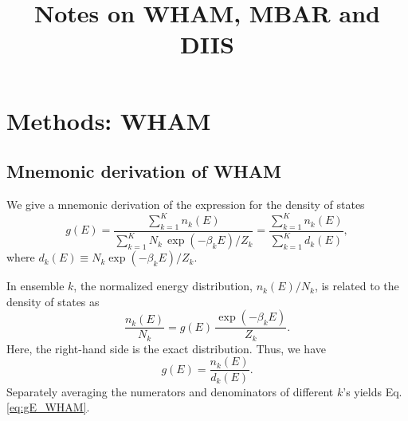 \documentclass[aip,jcp,preprint,notitlepage, superscriptaddress]{revtex4-1}
\begin{document}
\renewcommand{\theequation}{N.\arabic{equation}}

\newcommand{\vct}[1]{\bm{\mathrm{#1}}}
\newcommand{\vx}{\vct{x}}
\newcommand{\vy}{\vct{y}}
\newcommand{\Z}{\mathcal{Z}}
\newcommand{\E}{\mathcal{E}}
\newcommand{\Ham}{\mathcal{H}}
\newcommand{\W}{\mathcal{W}}
\newcommand{\A}{\mathcal{A}}
\newcommand{\var}{\mathrm{var}}

\newcommand{\repl}[2]{{\color{gray} [#1] }{\color{blue} #2}}
\newcommand{\add}[1]{{\color{blue} #1}}
\newcommand{\del}[1]{{\color{gray} [#1]}}
\newcommand{\note}[1]{{\color{OliveGreen}\small [\textbf{Comment.} #1]}}




\title{Notes on WHAM, MBAR and DIIS}

\maketitle


\tableofcontents



\section{Methods: WHAM}



\subsection{Mnemonic derivation of WHAM}



We give a mnemonic derivation of the expression
for the density of states
%
\begin{equation}
g(E)
=
\frac{
  \sum_{k = 1}^K n_k(E)
}
{
  \sum_{k = 1}^K N_k \, \exp(-\beta_k E) / Z_k
}
=
\frac{
  \sum_{k = 1}^K n_k(E)
}
{
  \sum_{k = 1}^K d_k(E)
},
\label{eq:gE_WHAM}
\end{equation}
%
where
$d_k(E) \equiv N_k \exp(-\beta_k E) / Z_k$.



In ensemble $k$,
the normalized energy distribution,
$n_k(E) / N_k$,
is related to the density of states as
%
\begin{equation}
\frac{ n_k(E) } { N_k }
=
g(E) \,
\frac{ \exp(-\beta_k E) } { Z_k }.
\end{equation}
%
Here, the right-hand side
is the exact distribution.
%
Thus,
we have
%
\begin{equation}
g(E)
=
\frac{ n_k(E) }
     { d_k(E) }.
\label{eq:gnk}
\end{equation}
%
Separately averaging the numerators and denominators of different $k$'s
yields Eq. \eqref{eq:gE_WHAM}.
\end{document}

